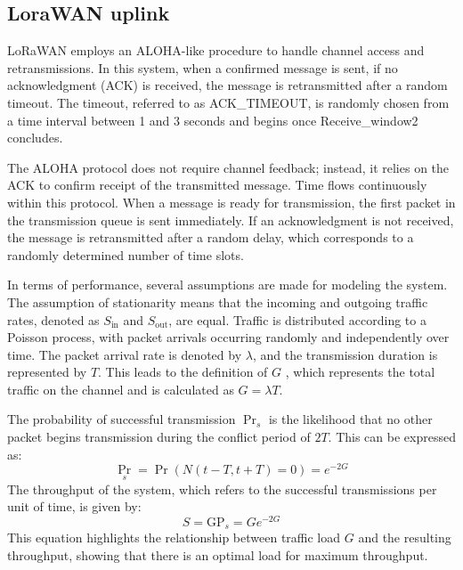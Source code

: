 \subsection{LoraWAN uplink}
LoRaWAN employs an ALOHA-like procedure to handle channel access and retransmissions. 
In this system, when a confirmed message is sent, if no acknowledgment (ACK) is received, the message is retransmitted after a random timeout. 
The timeout, referred to as ACK\_TIMEOUT, is randomly chosen from a time interval between 1 and 3 seconds and begins once Receive\_window2 concludes.

The ALOHA protocol does not require channel feedback; instead, it relies on the ACK to confirm receipt of the transmitted message. 
Time flows continuously within this protocol. 
When a message is ready for transmission, the first packet in the transmission queue is sent immediately. 
If an acknowledgment is not received, the message is retransmitted after a random delay, which corresponds to a randomly determined number of time slots.

In terms of performance, several assumptions are made for modeling the system. 
The assumption of stationarity means that the incoming and outgoing traffic rates, denoted as $S_{\text{in}}$ and $S_{\text{out}}$, are equal.
Traffic is distributed according to a Poisson process, with packet arrivals occurring randomly and independently over time.
The packet arrival rate is denoted by $\lambda$, and the transmission duration is represented by $T$. 
This leads to the definition of $G$ , which represents the total traffic on the channel and is calculated as $G=\lambda T$. 

The probability of successful transmission $\Pr_s$  is the likelihood that no other packet begins transmission during the conflict period of $2T$. 
This can be expressed as:
\[\Pr_s=\Pr(N(t-T,t+T)=0)=e^{-2G}\]
The throughput of the system, which refers to the successful transmissions per unit of time, is given by:
\[S=\text{GP}_s=Ge^{-2G}\]
This equation highlights the relationship between traffic load $G$ and the resulting throughput, showing that there is an optimal load for maximum throughput.
